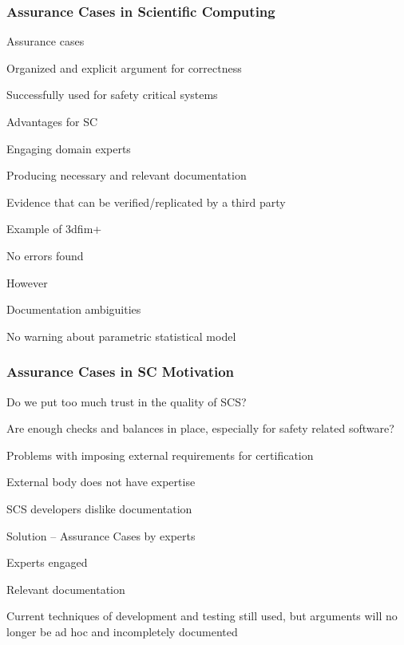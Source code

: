 \documentclass[t,12pt,numbers,fleqn]{beamer}
\begin{document}

\begin{frame}
\frametitle{Assurance Cases in Scientific Computing \cite{SmithEtAl2017}}

\bi
\item Assurance cases
\bi 
\item Organized and explicit argument for correctness
\item Successfully used for safety critical systems
\ei
\item Advantages for SC
\bi
\item Engaging domain experts
\item Producing necessary and relevant documentation
\item Evidence that can be verified/replicated by a third party
\ei
\item Example of 3dfim+
\bi
\item No errors found
\item However
\bi
\item Documentation ambiguities
\item No warning about parametric statistical model
\ei
\ei
\ei

\end{frame}


\begin{frame}
\frametitle{Assurance Cases in SC Motivation}

\bi
\item Do we put too much trust in the quality of SCS?
\item Are enough checks and balances in place, especially for safety related
  software?
\item Problems with imposing external requirements for certification
\bi
\item External body does not have expertise
\item SCS developers dislike documentation
\ei
\item Solution -- Assurance Cases by experts
\bi
\item Experts engaged
\item Relevant documentation
\ei
\item Current techniques of development and testing still used, but arguments
  will no longer be ad hoc and incompletely documented
\ei

\end{frame}
\end{document}
